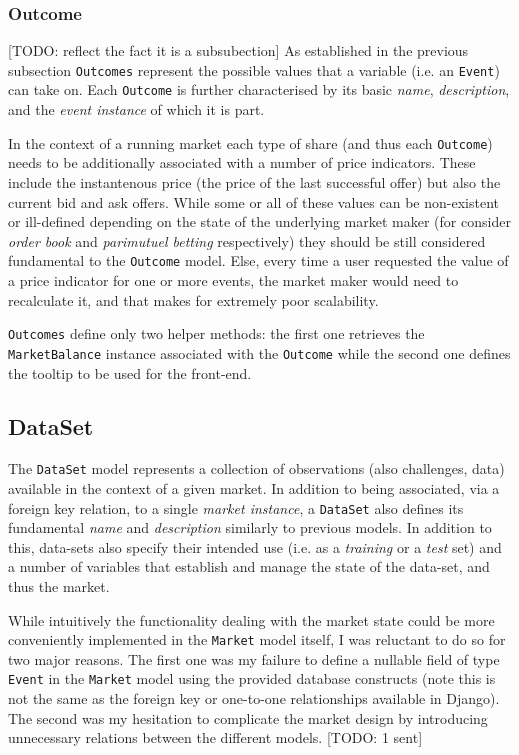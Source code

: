 \documentclass[bsc,frontabs,twoside,singlespacing,parskip,deptreport]{infthesis}     %
\begin{document}
\subsubsection{Outcome}
	[TODO: reflect the fact it is a subsubection]
	As established in the previous subsection {\tt Outcomes} represent the possible values that a variable (i.e. an {\tt Event}) can take on. Each {\tt Outcome} is further characterised by its basic {\it name}, {\it description}, and the {\it event instance} of which it is part. 

	In the context of a running market each type of share (and thus each {\tt Outcome}) needs to be additionally associated with a number of price indicators. These include the instantenous price (the price of the last successful offer) but also the current bid and ask offers. While some or all of these values can be non-existent or ill-defined depending on the state of the underlying market maker (for consider {\em order book} and {\em parimutuel betting} respectively) they should be still considered fundamental to the {\tt Outcome} model. Else, every time a user requested the value of a price indicator for one or more events, the market maker would need to recalculate it, and that makes for extremely poor scalability. 

	{\tt Outcomes} define only two helper methods: the first one retrieves the {\tt MarketBalance} instance associated with the {\tt Outcome} while the second one defines the tooltip to be used for the front-end. 

\subsection{DataSet}

	The {\tt DataSet} model represents a collection of observations (also challenges, data) available in the context of a given market. In addition to being associated, via a foreign key relation, to a single {\it market instance}, a {\tt DataSet} also defines its fundamental {\it name} and {\it description} similarly to previous models. In addition to this, data-sets also specify their intended use (i.e. as a {\it training} or a {\it test} set) and a number of variables that establish and manage the state of the data-set, and thus the market.
	
	While intuitively the functionality dealing with the market state could be more conveniently implemented in the {\tt Market} model itself, I was reluctant to do so for two major reasons. The first one was my failure to define a nullable field of type {\tt Event} in the {\tt Market} model using the provided database constructs (note this is not the same as the foreign key or one-to-one relationships available in Django). The second was my hesitation to complicate the market design by introducing unnecessary relations between the different models. [TODO: 1 sent]
\end{document}
